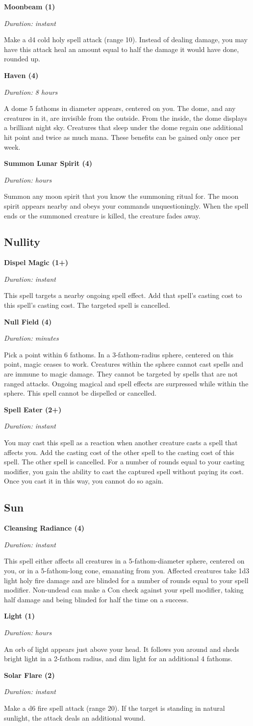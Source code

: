 \documentclass[letterpaper, 12pt, twocolumn]{book}
\def\unnumberedsubsection#1{\subsection*{#1}\addcontentsline{toc}{subsection}{#1}}
\def\spell#1#2#3#4{\textbf{#1 (#2)}

\textit{Duration: #3}

#4\bigskip}
\def\rangespellattack#1#2#3{Make a d#1 #2 spell attack (range #3).}
\def\create#1#2{Summon any #1 that you know the summoning ritual for. The #1 appears nearby and obeys your commands unquestioningly.
When the spell ends or the summoned creature is killed, the creature #2.}
\begin{document}
\spell{Moonbeam}{1}{instant}{\rangespellattack{4}{cold holy}{10} Instead of dealing damage, you may have this attack heal an amount equal to
half the damage it would have done, rounded up.}

\spell{Haven}{4}{8 hours}{A dome 5 fathoms in diameter appears, centered on you. The dome, and any creatures in it, are invisible
from the outside. From the inside, the dome displays a brilliant night sky. Creatures that sleep under the dome regain one additional
hit point and twice as much mana. These benefits can be gained only once per week.}

\spell{Summon Lunar Spirit}{4}{hours}{\create{moon spirit}{fades away}}


\unnumberedsubsection{Nullity}
\spell{Dispel Magic}{1+}{instant}{This spell targets a nearby ongoing spell effect. Add that spell's casting cost to this spell's
casting cost. The targeted spell is cancelled.}

\spell{Null Field}{4}{minutes}{Pick a point within 6 fathoms. In a 3-fathom-radius sphere, centered on this point, magic ceases to work.
Creatures within the sphere cannot cast spells and are immune to magic damage. They cannot be targeted by spells that are not ranged
attacks. Ongoing magical and spell effects are surpressed while within the sphere. This spell cannot be dispelled or cancelled.}

\spell{Spell Eater}{2+}{instant}{You may cast this spell as a reaction when another creature casts a spell that affects you. Add the
casting cost of the other spell to the casting cost of this spell. The other spell is cancelled. For a number of rounds equal to your
casting modifier, you gain the ability to cast the captured spell without paying its cost. Once you cast it in this way, you cannot do
so again.}


\unnumberedsubsection{Sun}
\spell{Cleansing Radiance}{4}{instant}{This spell either affects all creatures in a 5-fathom-diameter sphere, centered on you, or in a 5-fathom-long
cone, emanating from you. Affected creatures take 1d3 light holy fire damage and are blinded for a number of rounds equal to your spell
modifier. Non-undead can make a Con check against your spell modifier, taking half damage and being blinded for half the time on a success.}

\spell{Light}{1}{hours}{An orb of light appears just above your head. It follows you around and sheds bright light in a 2-fathom radius, and
dim light for an additional 4 fathoms.}

\spell{Solar Flare}{2}{instant}{\rangespellattack{6}{fire}{20} If the target is standing in natural sunlight, the attack deals an additional
wound.}
\end{document}
